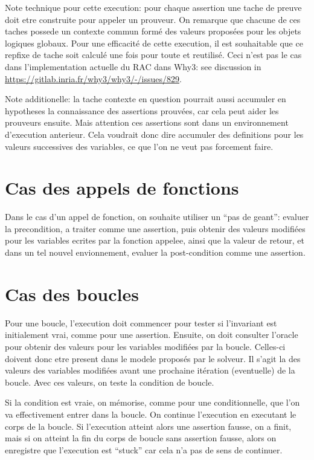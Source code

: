 \documentclass[a4paper,twoside]{article}
\begin{document}
Note technique pour cette execution: pour chaque assertion une tache de preuve
doit etre construite pour appeler un prouveur. On remarque que chacune de ces
taches possede un contexte commun formé des valeurs proposées pour les objets
logiques globaux. Pour une efficacité de cette execution, il est souhaitable que
ce repfixe de tache soit calculé une fois pour toute et reutilisé. Ceci n'est
pas le cas dans l'implementation actuelle du RAC dans Why3: see discussion in
\url{https://gitlab.inria.fr/why3/why3/-/issues/829}.

Note additionelle: la tache contexte en question pourrait aussi accumuler en
hypotheses la connaissance des assertions prouvées, car cela peut aider les
prouveurs ensuite. Mais attention ces assertions sont dans un environnement
d'execution anterieur. Cela voudrait donc dire accumuler des definitions pour
les valeurs successives des variables, ce que l'on ne veut pas forcement faire.


\section{Cas des appels de fonctions}


Dans le cas d'un appel de fonction, on souhaite utiliser un ``pas de geant'':
evaluer la precondition, a traiter comme une assertion, puis obtenir des valeurs
modifiées pour les variables ecrites par la fonction appelee, ainsi que la
valeur de retour, et dans un tel nouvel envionnement, evaluer la post-condition
comme une assertion.

\section{Cas des boucles}

Pour une boucle, l'execution doit commencer pour tester si l'invariant est
initialement vrai, comme pour une assertion. Ensuite, on doit consulter l'oracle
pour obtenir des valeurs pour les variables modifiées par la boucle. Celles-ci
doivent donc etre present dans le modele proposés par le solveur. Il s'agit la
des valeurs des variables modifiées avant une prochaine itération (eventuelle) de
la boucle. Avec ces valeurs, on teste la condition de boucle.

Si la condition est vraie, on mémorise, comme pour une conditionnelle, que l'on
va effectivement entrer dans la boucle. On continue l'execution en executant le
corps de la boucle. Si l'execution atteint alors une assertion fausse, on a
finit, mais si on atteint la fin du corps de boucle sans assertion fausse, alors
on enregistre que l'execution est ``stuck'' car cela n'a pas de sens de
continuer.
\end{document}
